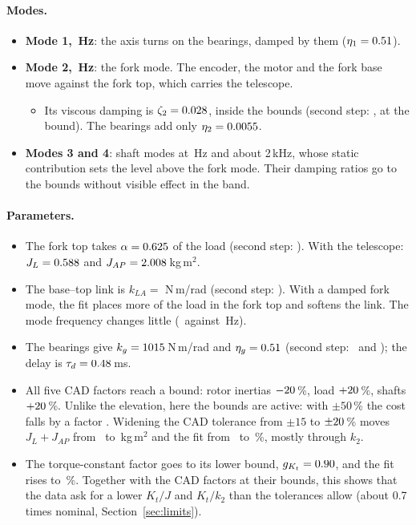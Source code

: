 \documentclass[10pt,a4paper]{article}
\numberwithin{equation}{section}
\begin{document}
\paragraph{Modes.}
\begin{itemize}
\item \textbf{Mode 1, \fBearA\,Hz}: the axis turns on the bearings, damped by them ($\eta_1=0.51$).
\item \textbf{Mode 2, \fForkA\,Hz}: the fork mode. The encoder, the motor and the fork base move against the fork top, which carries the telescope.
  \begin{itemize}
  \item Its viscous damping is $\zeta_2=0.028$, inside the bounds (second step: \zForkStep, at the bound). The bearings add only $\eta_2=0.0055$.
  \end{itemize}
\item \textbf{Modes 3 and 4}: shaft modes at \fShaftA\,Hz and about 2\,kHz, whose static contribution sets the level above the fork mode. Their damping ratios go to the bounds without visible effect in the band.
\end{itemize}

\paragraph{Parameters.}
\begin{itemize}
\item The fork top takes $\alpha=0.625$ of the load (second step: \alphaStep). With the telescope: $J_L=0.588$ and $J_{AP}=2.008$\,kg\,m$^2$.
\item The base--top link is $k_{LA}=$\,\kLA\,N\,m/rad (second step: \kLAStep). With a damped fork mode, the fit places more of the load in the fork top and softens the link. The mode frequency changes little (\fForkA\ against \fForkStep\,Hz).
\item The bearings give $k_g=1015$\,N\,m/rad and $\eta_g=0.51$ (second step: \kgAStep\ and \etaAStep); the delay is $\tau_d=0.48$\,ms.
\item All five CAD factors reach a bound: rotor inertias $-20$\,\%, load $+20$\,\%, shafts $+20$\,\%. Unlike the elevation, here the bounds are active: with $\pm50$\,\% the cost falls by a factor \cadCostA. Widening the CAD tolerance from $\pm15$ to $\pm20$\,\% moves $J_L+J_{AP}$ from \JtotAStepJ\ to \JtotA\,kg\,m$^2$ and the fit from \fitAStepJ\ to \fitAFour\,\%, mostly through $k_2$.
\item The torque-constant factor goes to its lower bound, $g_{K_t}=0.90$, and the fit rises to \fitA\,\%. Together with the CAD factors at their bounds, this shows that the data ask for a lower $K_t/J$ and $K_t/k_2$ than the tolerances allow (about 0.7 times nominal, Section~\ref{sec:limits}).
\end{itemize}
\end{document}
